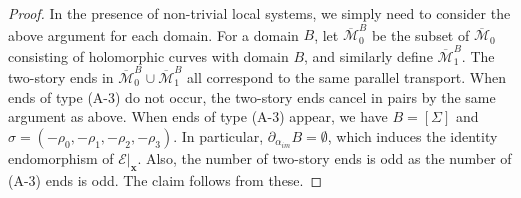 \documentclass[10pt,a4paper]{amsart}
\begin{document}
\begin{proof}
In the presence of non-trivial local systems, we simply need to consider the above argument for each domain. For a domain $B$, let $\overline{\mathcal{M}}_0^B$ be the subset of $\overline{\mathcal{M}}_0$ consisting of holomorphic curves with domain $B$, and similarly define $\overline{\mathcal{M}}_1^B$. The two-story ends in $\overline{\mathcal{M}}_0^B\cup \overline{\mathcal{M}}_1^B$ all correspond to the same parallel transport. When ends of type (A-3) do not occur, the two-story ends cancel in pairs by the same argument as above. When ends of type (A-3) appear, we have $B=[\Sigma]$ and $\sigma=(-\rho_0,-\rho_1,-\rho_2,-\rho_3)$. In particular, $\partial_{\alpha_{im}}B=\emptyset$, which induces the identity endomorphism of $\mathcal{E}|_{\bm{x}}$. Also, the number of two-story ends is odd as the number of (A-3) ends is odd. The claim follows from these. 
\end{proof}
\end{document}

